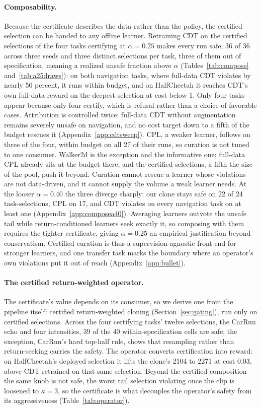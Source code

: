 \documentclass{article} %
\begin{document}
\paragraph{Composability.} Because the certificate describes the data rather than the policy, the certified selection can be handed to any offline learner. Retraining CDT on the certified selections of the four tasks certifying at $\alpha = 0.25$ makes every run safe, 36 of 36 across three seeds and three distinct selections per task, three of them out of specification, meaning a realized unsafe fraction above $\alpha$ (Tables~\ref{tab:compose} and~\ref{tab:a25draws}): on both navigation tasks, where full-data CDT violates by nearly 50 percent, it runs within budget, and on HalfCheetah it reaches CDT's own full-data reward on the deepest selection at cost below 1. Only four tasks appear because only four certify, which is refusal rather than a choice of favorable cases. Attribution is controlled twice: full-data CDT without augmentation remains severely unsafe on navigation, and no cost target down to a fifth of the budget rescues it (Appendix~\ref{app:cdtsweep}). CPL, a weaker learner, follows on three of the four, within budget on all 27 of their runs, so curation is not tuned to one consumer. Walker2d is the exception and the informative one: full-data CPL already sits at the budget there, and the certified selections, a fifth the size of the pool, push it beyond. Curation cannot rescue a learner whose violations are not data-driven, and it cannot supply the volume a weak learner needs. At the looser $\alpha = 0.40$ the three diverge sharply: our clone stays safe on 22 of 24 task-selections, CPL on 17, and CDT violates on every navigation task on at least one (Appendix~\ref{app:composea40}). Averaging learners outvote the unsafe tail while return-conditioned learners seek exactly it, so composing with them requires the tighter certificate, giving $\alpha = 0.25$ an empirical justification beyond conservatism. Certified curation is thus a supervision-agnostic front end for stronger learners, and one transfer task marks the boundary where an operator's own violations put it out of reach (Appendix~\ref{app:bullet}).

\paragraph{The certified return-weighted operator.} The certificate's value depends on its consumer, so we derive one from the pipeline itself: certified return-weighted cloning (Section~\ref{sec:gating}), run only on certified selections. Across the four certifying tasks' twelve selections, the CarRun echo and four intensities, 39 of the 40 within-specification cells are safe; the exception, CarRun's hard top-half rule, shows that resampling rather than return-seeking carries the safety. The operator converts certification into reward: on HalfCheetah's deployed selection it lifts the clone's 2104 to 2271 at cost 0.03, above CDT retrained on that same selection. Beyond the certified composition the same knob is not safe, the worst tail selection violating once the clip is loosened to $\kappa = 3$, so the certificate is what decouples the operator's safety from its aggressiveness (Table~\ref{tab:operator}).
\end{document}
